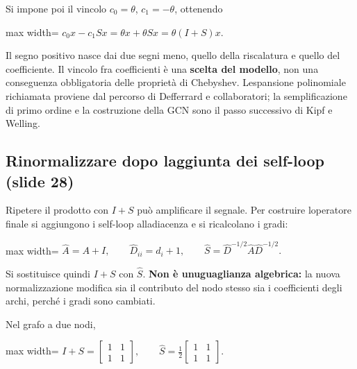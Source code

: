 \documentclass[11pt,a4paper,oneside,openany]{book}
\begin{document}
Si impone poi il vincolo \(c_0=\theta\), \(c_1=-\theta\), ottenendo

\begin{center}
\begin{adjustbox}{max width=\linewidth}
$\displaystyle c_0x-c_1Sx=\theta x+\theta Sx=\boxed{\theta(I+S)x.}$
\end{adjustbox}
\end{center}

Il segno positivo nasce dai due segni meno, quello della riscalatura e quello del coefficiente. Il vincolo fra coefficienti è una \textbf{scelta del modello}, non una conseguenza obbligatoria delle proprietà di Chebyshev. L\textquotesingle espansione polinomiale richiamata proviene dal percorso di Defferrard e collaboratori; la semplificazione di primo ordine e la costruzione della GCN sono il passo successivo di Kipf e Welling.

\subsection{Rinormalizzare dopo l\textquotesingle aggiunta dei self-loop (slide 28)}\label{f05-r516}

Ripetere il prodotto con \(I+S\) può amplificare il segnale. Per costruire l\textquotesingle operatore finale si aggiungono i self-loop all\textquotesingle adiacenza e si ricalcolano i gradi:

\begin{center}
\begin{adjustbox}{max width=\linewidth}
$\displaystyle \widehat A=A+I,\qquad
\widehat D_{ii}=d_i+1,\qquad
\widehat S=\widehat D^{-1/2}\widehat A\widehat D^{-1/2}.$
\end{adjustbox}
\end{center}

Si sostituisce quindi \(I+S\) con \(\widehat S\). \textbf{Non è un\textquotesingle uguaglianza algebrica:} la nuova normalizzazione modifica sia il contributo del nodo stesso sia i coefficienti degli archi, perché i gradi sono cambiati.

Nel grafo a due nodi,

\begin{center}
\begin{adjustbox}{max width=\linewidth}
$\displaystyle I+S=\begin{bmatrix}1&1\\1&1\end{bmatrix},\qquad
\widehat S=\frac12\begin{bmatrix}1&1\\1&1\end{bmatrix}.$
\end{adjustbox}
\end{center}
\end{document}
